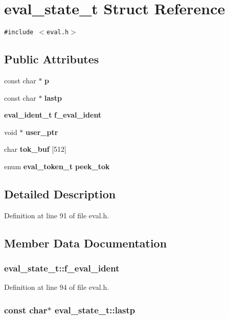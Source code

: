 \section{eval\_\-state\_\-t Struct Reference}
\label{structeval__state__t}
{\tt \#include $<$eval.h$>$}

\subsection*{Public Attributes}
\begin{CompactItemize}
\item 
const char $\ast$ {\bf p}
\item 
const char $\ast$ {\bf lastp}
\item 
{\bf eval\_\-ident\_\-t} {\bf f\_\-eval\_\-ident}
\item 
void $\ast$ {\bf user\_\-ptr}
\item 
char {\bf tok\_\-buf} [512]
\item 
enum {\bf eval\_\-token\_\-t} {\bf peek\_\-tok}
\end{CompactItemize}


\subsection{Detailed Description}


Definition at line 91 of file eval.h.

\subsection{Member Data Documentation}
\subsubsection[{f\_\-eval\_\-ident}]{ {\bf eval\_\-state\_\-t::f\_\-eval\_\-ident}}\label{structeval__state__t_9a1aa5c21528ae40514209e6f19a92e4}




Definition at line 94 of file eval.h.
\subsubsection[{lastp}]{\setlength{\rightskip}{0pt plus 5cm}const char$\ast$ {\bf eval\_\-state\_\-t::lastp}}\label{structeval__state__t_250f34d090285d15bdf7de9185a21e3f}




